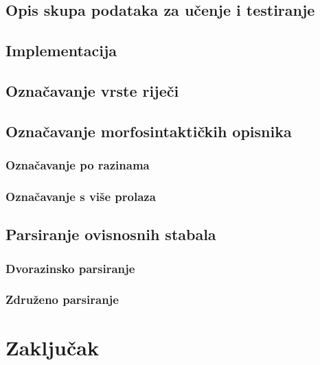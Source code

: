 \documentclass[times, utf8, diplomski]{fer}
\begin{document}
\section{Opis skupa podataka za učenje i testiranje}


\section{Implementacija}

\section{Označavanje vrste riječi}

\section{Označavanje morfosintaktičkih opisnika}

\subsection{Označavanje po razinama}

\subsection{Označavanje s više prolaza}

\section{Parsiranje ovisnosnih stabala}

\subsection{Dvorazinsko parsiranje}

\subsection{Združeno parsiranje}

\chapter{Zaključak}










\nocite{daume06thesis}
\nocite{daume09searn}
\nocite{daume06searn-practice}
\nocite{daume15reductions}
\nocite{daume15lols}
\nocite{daume15rewrite}
\nocite{daume14lts}
\end{document}
